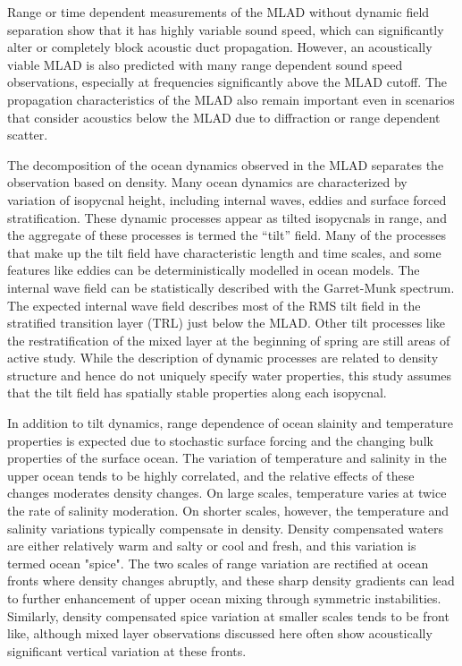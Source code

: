 \documentclass[preprint,NumberedRefs]{JASA}
\begin{document}
Range or time dependent measurements of the MLAD without dynamic field separation show that it has highly variable sound speed\citep{cole2010seasonal,rudnick1999compensation,klymak2015}, which can significantly alter or completely block acoustic duct propagation\citep{colosi2020observations,colosi21}. However, an acoustically viable MLAD is also predicted with many range dependent sound speed observations, especially at frequencies significantly above the MLAD cutoff. The propagation characteristics of the MLAD also remain important even in scenarios that consider acoustics below the MLAD due to diffraction or range dependent scatter\citep{colosi21}.

The decomposition of the ocean dynamics observed in the MLAD separates the observation based on density. Many ocean dynamics are characterized by variation of isopycnal height, including internal waves, eddies and surface forced stratification. These dynamic processes appear as tilted isopycnals in range, and the aggregate of these processes is termed the ``tilt'' field\cite{dzieciuch2004}. Many of the processes that make up the tilt field have characteristic length and time scales, and some features like eddies can be deterministically modelled in ocean models. The internal wave field can be statistically described with the Garret-Munk spectrum\cite{garrett1972space}. The expected internal wave field describes most of the RMS tilt field in the stratified transition layer (TRL) just below the MLAD. Other tilt processes like the restratification of the mixed layer at the beginning of spring are still areas of active study\cite{cole2010seasonal}. While the description of dynamic processes are related to density structure and hence do not uniquely specify water properties, this study assumes that the tilt field has spatially stable properties along each isopycnal.

In addition to tilt dynamics, range dependence of ocean slainity and temperature properties is expected due to stochastic surface forcing and the changing bulk properties of the surface ocean\citep{ferrari2000}. The variation of temperature and salinity in the upper ocean tends to be highly correlated, and the relative effects of these changes moderates density changes. On large scales, temperature varies at twice the rate of salinity moderation. On shorter scales, however, the temperature and salinity variations typically compensate in density. Density compensated waters are either relatively warm and salty or cool and fresh, and this variation is termed ocean "spice"\citep{munk1981evolution}. The two scales of range variation are rectified at ocean fronts where density changes abruptly, and these sharp density gradients can lead to further enhancement of upper ocean mixing through symmetric instabilities\citep{dasaro2011}. Similarly, density compensated spice variation at smaller scales tends to be front like, although mixed layer observations discussed here often show acoustically significant vertical variation at these fronts.
\end{document}
